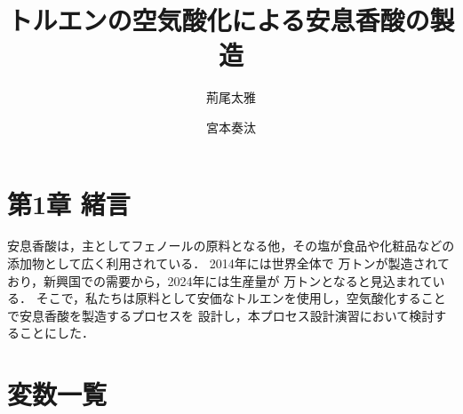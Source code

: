 \documentclass[a4j, titlepage]{jsarticle}
\title{トルエンの空気酸化による安息香酸の製造}
\author{荊尾太雅 \and 宮本奏汰}
\begin{document}
\maketitle

\section*{第1章 緒言}
安息香酸は，主としてフェノールの原料となる他，その塩が食品や化粧品などの添加物として広く利用されている．
2014年には世界全体で 万トンが製造されており，新興国での需要から，2024年には生産量が 万トンとなると見込まれている．
そこで，私たちは原料として安価なトルエンを使用し，空気酸化することで安息香酸を製造するプロセスを
設計し，本プロセス設計演習において検討することにした．

\newpage
\section{変数一覧}
\end{document}
